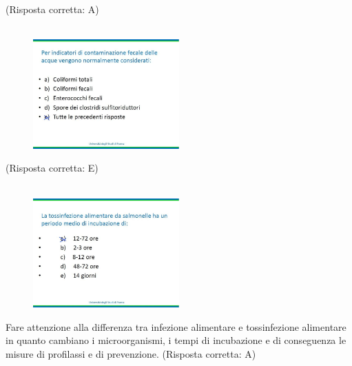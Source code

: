(Risposta corretta: A)
\\\\
\begin{figure}[!ht]
\centering
	\includegraphics[width=0.5\textwidth]{25/image10.jpeg}
	\end{figure}

(Risposta corretta: E)
\\\\
\begin{figure}[!ht]
\centering
	\includegraphics[width=0.5\textwidth]{25/image11.jpeg}
	\end{figure}

Fare attenzione alla differenza tra infezione alimentare e tossinfezione
alimentare in quanto cambiano i microorganismi, i tempi di incubazione e
di conseguenza le misure di profilassi e di prevenzione. (Risposta
corretta: A)
